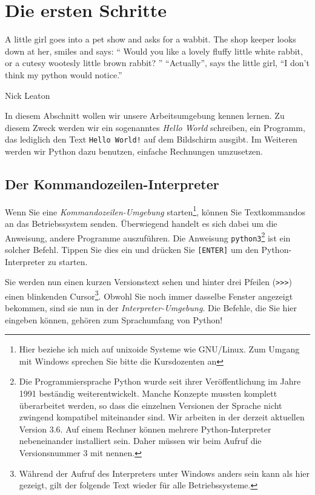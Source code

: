 \chapter{Die ersten Schritte}
\epigraph{
	A little girl goes into a pet show and asks for a wabbit. The shop keeper looks down at her, smiles
	and says:\newline
	\enquote{
		Would you like a lovely fluffy little white rabbit, or a cutesy wootesly little brown rabbit?
	}\newline
	\enquote{Actually}, says the little girl, \enquote{I don't think my python would notice.}
}{Nick Leaton}

In diesem Abschnitt wollen wir unsere Arbeitsumgebung kennen lernen. Zu diesem Zweck werden wir ein sogenanntes \emph{Hello World} schreiben, \ie ein Programm, das lediglich den Text \texttt{Hello World!} auf dem Bildschirm ausgibt. Im Weiteren werden wir Python dazu benutzen, einfache Rechnungen umzusetzen.



\section{Der Kommandozeilen-Interpreter} \label{sec:Interpreter}
Wenn Sie eine \emph{Kommandozeilen-Umgebung} starten\footnote{Hier beziehe ich mich auf unixoide Systeme wie GNU/Linux. Zum Umgang mit Windows sprechen Sie bitte die Kursdozenten an}, können Sie Textkommandos an das Betriebssystem senden. Überwiegend handelt es sich dabei um die Anweisung, andere Programme auszuführen. Die Anweisung \texttt{python3}\footnote{Die Programmiersprache Python wurde seit ihrer Veröffentlichung im Jahre 1991 beständig weiterentwickelt. Manche Konzepte mussten komplett überarbeitet werden, so dass die einzelnen Versionen der Sprache nicht zwingend kompatibel miteinander sind. Wir arbeiten in der derzeit aktuellen Version 3.6. Auf einem Rechner können mehrere Python-Interpreter nebeneinander installiert sein. Daher müssen wir beim Aufruf die Versionsnummer 3 mit nennen.} ist ein solcher Befehl. Tippen Sie dies ein und drücken Sie \texttt{[ENTER]} um den Python-Interpreter zu starten.

Sie werden nun einen kurzen Versionstext sehen und hinter drei Pfeilen (\texttt{>{}>{}>}) einen blinkenden Cursor\footnote{Während der Aufruf des Interpreters unter Windows anders sein kann als hier gezeigt, gilt der folgende Text wieder für alle Betriebssysteme.}. Obwohl Sie noch immer dasselbe Fenster angezeigt bekommen, sind sie nun in der \emph{Interpreter-Umgebung}. Die Befehle, die Sie hier eingeben können, gehören zum Sprachumfang von Python!


